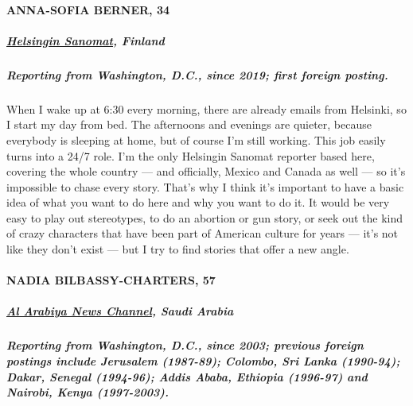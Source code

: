 \hypertarget{anna-sofia-berner-34}{%
\paragraph{ANNA-SOFIA BERNER, 34}\label{anna-sofia-berner-34}}

\hypertarget{helsingin-sanomat-finland}{%
\subparagraph{\texorpdfstring{\textbf{\href{https://www.hs.fi/}{Helsingin
Sanomat},
Finland}}{Helsingin Sanomat, Finland}}\label{helsingin-sanomat-finland}}

\hypertarget{reporting-from-washington-dc-since-2019-first-foreign-posting}{%
\subparagraph{\texorpdfstring{\textbf{Reporting from Washington, D.C.,
since 2019; first foreign
posting.}}{Reporting from Washington, D.C., since 2019; first foreign posting.}}\label{reporting-from-washington-dc-since-2019-first-foreign-posting}}

When I wake up at 6:30 every morning, there are already emails from
Helsinki, so I start my day from bed. The afternoons and evenings are
quieter, because everybody is sleeping at home, but of course I'm still
working. This job easily turns into a 24/7 role. I'm the only Helsingin
Sanomat reporter based here, covering the whole country --- and
officially, Mexico and Canada as well --- so it's impossible to chase
every story. That's why I think it's important to have a basic idea of
what you want to do here and why you want to do it. It would be very
easy to play out stereotypes, to do an abortion or gun story, or seek
out the kind of crazy characters that have been part of American culture
for years --- it's not like they don't exist --- but I try to find
stories that offer a new angle.

\hypertarget{nadia-bilbassy-charters-57}{%
\paragraph{NADIA BILBASSY-CHARTERS,
57}\label{nadia-bilbassy-charters-57}}

\hypertarget{al-arabiya-news-channel-saudi-arabia}{%
\subparagraph{\texorpdfstring{\textbf{\href{https://english.alarabiya.net/}{Al
Arabiya News Channel}, Saudi
Arabia}}{Al Arabiya News Channel, Saudi Arabia}}\label{al-arabiya-news-channel-saudi-arabia}}

\hypertarget{reporting-from-washington-dc-since-2003-previous-foreign-postings-include-jerusalem-1987-89-colombo-sri-lanka-1990-94-dakar-senegal-1994-96-addis-ababa-ethiopia-1996-97-and-nairobi-kenya-1997-2003}{%
\subparagraph{\texorpdfstring{\textbf{Reporting from Washington, D.C.,
since 2003; previous foreign postings include Jerusalem (1987-89);
Colombo, Sri Lanka (1990-94); Dakar, Senegal (1994-96); Addis Ababa,
Ethiopia (1996-97) and Nairobi, Kenya
(1997-2003).}}{Reporting from Washington, D.C., since 2003; previous foreign postings include Jerusalem (1987-89); Colombo, Sri Lanka (1990-94); Dakar, Senegal (1994-96); Addis Ababa, Ethiopia (1996-97) and Nairobi, Kenya (1997-2003).}}\label{reporting-from-washington-dc-since-2003-previous-foreign-postings-include-jerusalem-1987-89-colombo-sri-lanka-1990-94-dakar-senegal-1994-96-addis-ababa-ethiopia-1996-97-and-nairobi-kenya-1997-2003}}

